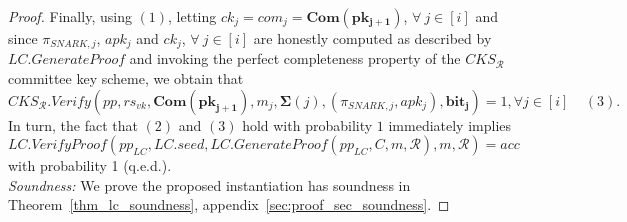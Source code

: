 \begin{proof}
\noindent Finally, using $(1)$, letting $ \mathit{ck_j} = \mathit{com_j} = \mathbf{Com}(\mathbf{pk_{j+1}})$, $ \forall \ j \in [i]$ and since 
$\pi_{\mathit{SNARK,j}}$, $\mathit{apk_j}$ and $\mathit{ck_j}$, $\forall \ j \in [i]$ are honestly computed as described by  
$\mathit{LC.GenerateProof}$ and invoking the perfect completeness property of the $\mathit{CKS_{\mathcal{R}}}$ committee key scheme, 
we obtain that $$\mathit{CKS_{\mathcal{R}}.Verify}(\mathit{pp}, \mathit{rs}_{\mathit{vk}}, \mathbf{Com}(\mathbf{pk}_{\mathbf{j+1}}), 
m_j, \mathbf{\Sigma}(j), (\pi_{\mathit{SNARK,j}}, \mathit{apk_j}), \mathbf{bit_j}) = 1, \forall j \in [i]  \ \ \ \ \ (3).$$
In turn, the fact that $(2)$ and $(3)$ hold with probability $1$ immediately implies 
$$\mathit{LC.VerifyProof}(\mathit{pp}_{\mathit{LC}},\mathit{LC.seed}, \mathit{LC .GenerateProof}(\mathit{pp}_{\mathit{LC}}, C, m, \mathcal{R}),m, \mathcal{R}) = \mathit{acc}$$ with probability 1 (q.e.d.). \\

\noindent \textit{Soundness:} We prove the proposed instantiation has soundness in 
Theorem~\ref{thm_lc_soundness}, appendix~\ref{sec:proof_sec_soundness}. 
\end{proof}

